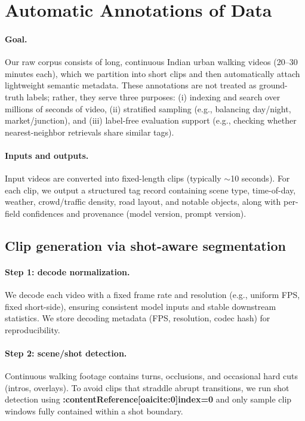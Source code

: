 



\section{Automatic Annotations of Data}\label{sec:auto_annotations}
\paragraph{Goal.} Our raw corpus consists of long, continuous Indian urban walking videos (20--30 minutes each), which we partition into short clips and then automatically attach lightweight semantic metadata. These annotations are not treated as ground-truth labels; rather, they serve three purposes: (i) indexing and search over millions of seconds of video, (ii) stratified sampling (e.g., balancing day/night, market/junction), and (iii) label-free evaluation support (e.g., checking whether nearest-neighbor retrievals share similar tags).
\paragraph{Inputs and outputs.} Input videos are converted into fixed-length clips (typically $\sim$10 seconds). For each clip, we output a structured tag record containing scene type, time-of-day, weather, crowd/traffic density, road layout, and notable objects, along with per-field confidences and provenance (model version, prompt version).

\subsection{Clip generation via shot-aware segmentation}\label{sec:clip_generation}
\paragraph{Step 1: decode normalization.} We decode each video with a fixed frame rate and resolution (e.g., uniform FPS, fixed short-side), ensuring consistent model inputs and stable downstream statistics. We store decoding metadata (FPS, resolution, codec hash) for reproducibility.
\paragraph{Step 2: scene/shot detection.} Continuous walking footage contains turns, occlusions, and occasional hard cuts (intros, overlays). To avoid clips that straddle abrupt transitions, we run shot detection using \textbf{:contentReference[oaicite:0]{index=0}} and only sample clip windows fully contained within a shot boundary.
